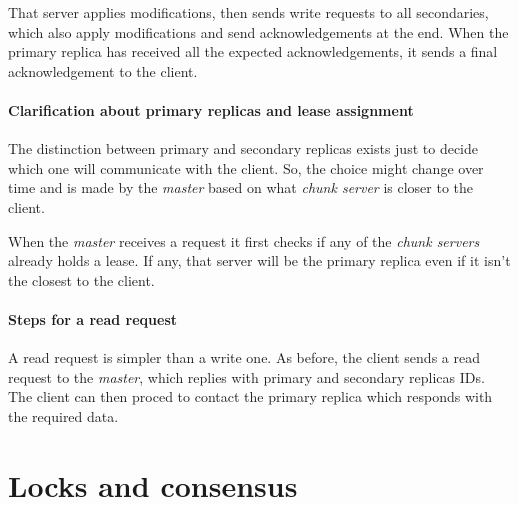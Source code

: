 That server applies modifications, then sends write requests to all secondaries,
which also apply modifications and send acknowledgements at the end. When the
primary replica has received all the expected acknowledgements, it sends a
final acknowledgement to the client.

\paragraph{Clarification about primary replicas and lease assignment}
The distinction between primary and secondary replicas exists just to decide
which one will communicate with the client. So, the choice might change over
time and is made by the \emph{master} based on what \emph{chunk server} is
closer to the client.

When the \emph{master} receives a request it first checks if any of the
\emph{chunk servers} already holds a lease. If any, that server will be the
primary replica even if it isn't the closest to the client.

\paragraph{Steps for a read request}
A read request is simpler than a write one. As before, the client sends a read
request to the \emph{master}, which replies with primary and secondary replicas
IDs. The client can then proced to contact the primary replica which responds
with the required data.

\section{Locks and consensus}
